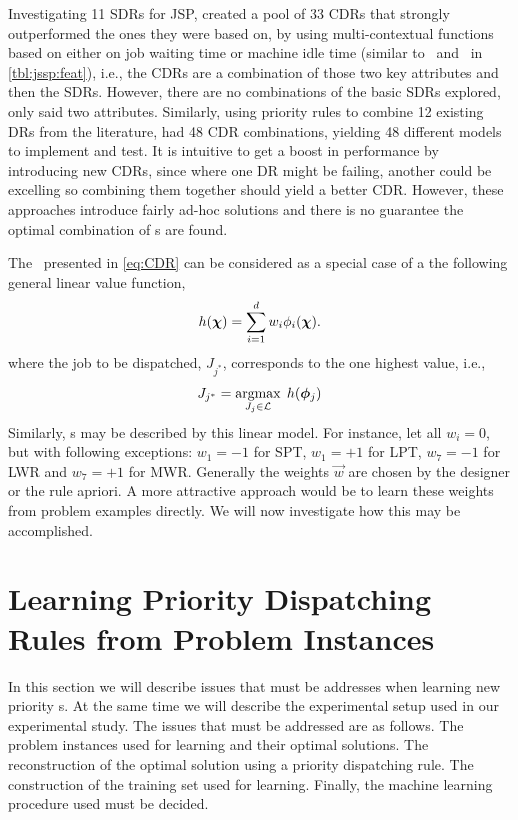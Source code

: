 \documentclass[smallextended]{svjour3}
\begin{document}
Investigating 11 SDRs for JSP, \cite{Lu13} created a pool of 33 CDRs that 
strongly outperformed the ones they were based on, by using multi-contextual 
functions based on either on job waiting time or machine idle time 
(similar to \phiwait\ and \phimacSlack\ in \cref{tbl:jssp:feat}), i.e., the 
CDRs are a combination of those two key attributes and then the SDRs. 
However, there are no combinations of the basic SDRs explored, only 
said two attributes.  
Similarly, using priority rules to combine 12 existing DRs from the literature, 
\cite{Yu13} had 48 CDR combinations, yielding 48 different models 
to implement and test. 
It is intuitive to get a boost in performance by introducing new CDRs, since 
where one DR might be failing, another could be excelling so combining them 
together should yield a better CDR. However, these approaches introduce fairly 
ad-hoc solutions and there is no guarantee the optimal combination of 
\dr s are found.


The \cdr\ presented in \cref{eq:CDR} can be 
considered as a special case of a the following general linear value function,
\begin{equation}\label{eq:jssp:linweights}
	h(\bm \chi)=\sum_{i=1}^d w_i\phi_i(\bm \chi).
\end{equation}
where the job to be dispatched, $J_{j^*}$, corresponds to the one highest 
value, i.e.,
\begin{equation}\label{eq:lin}
	J_{j^*}=\mathop{\rm argmax}_{J_j\in \mathcal{L}}\; h(\bm{\phi}_j)
\end{equation}
Similarly, \sdr s may be described by this linear model. For instance, let all 
$w_i=0$, but with following exceptions: $w_1=-1$ for SPT, $w_1=+1$ for LPT, 
$w_7=-1$ for LWR and $w_7=+1$ for MWR. Generally the weights $\vec{w}$ are 
chosen by the designer or the 
rule apriori.  A more attractive approach would be to learn these weights from 
problem examples directly. We will now investigate how this may be accomplished.


\section{Learning Priority Dispatching Rules from Problem 
Instances}\label{sec:learnCDR}

In this section we will describe issues that must be addresses when learning 
new priority \dr s. At the same time we will describe the experimental setup 
used in our experimental study. The issues that must be addressed are as 
follows. The problem instances used for learning and their optimal solutions. 
The reconstruction of the optimal solution using a priority dispatching rule. 
The construction of the training set used for learning. Finally, the
machine learning procedure used must be decided.
\end{document}
